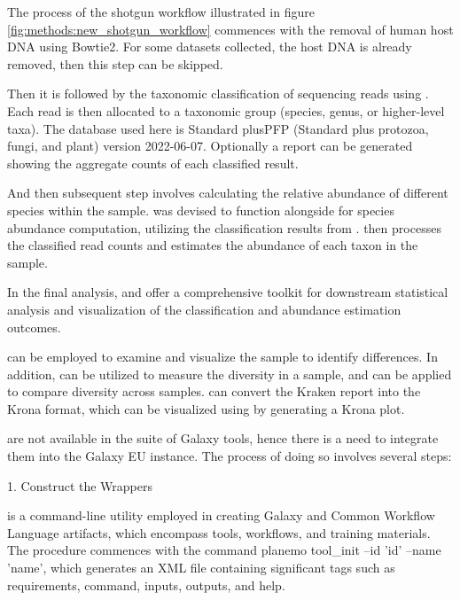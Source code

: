         The process of the shotgun workflow illustrated in figure \ref{fig:methods:new_shotgun_workflow} commences with the removal of human host DNA using Bowtie2. For some datasets collected, the host DNA is already removed, then this step can be skipped.

        Then it is followed by the taxonomic classification of sequencing reads using \cite{wood2019improved}. Each read is then allocated to a taxonomic group (species, genus, or higher-level taxa). The database used here is Standard plusPFP (Standard plus protozoa, fungi, and plant) version 2022-06-07. Optionally a report can be generated showing the aggregate counts of each classified result.
        
        And then subsequent step involves calculating the relative abundance of different species within the sample.  was devised to function alongside  for species abundance computation, utilizing the classification results from .  \cite{lu2017bracken} then processes the classified read counts and estimates the abundance of each taxon in the sample.
        
        In the final analysis,  and  \cite{breitwieser2020pavian} offer a comprehensive toolkit for downstream statistical analysis and visualization of the classification and abundance estimation outcomes.
        
         can be employed to examine and visualize the sample to identify differences. In addition,  can be utilized to measure the diversity in a sample, and  can be applied to compare diversity across samples.  can convert the Kraken report into the Krona format, which can be visualized using  by generating a Krona plot.

           are not available in the suite of Galaxy tools, hence there is a need to integrate them into the Galaxy EU instance. The process of doing so involves several steps:

            1. Construct the Wrappers
            
             is a command-line utility employed in creating Galaxy and Common Workflow Language artifacts, which encompass tools, workflows, and training materials. The procedure commences with the command planemo tool\_init --id 'id' --name 'name', which generates an XML file containing significant tags such as requirements, command, inputs, outputs, and help.
            
